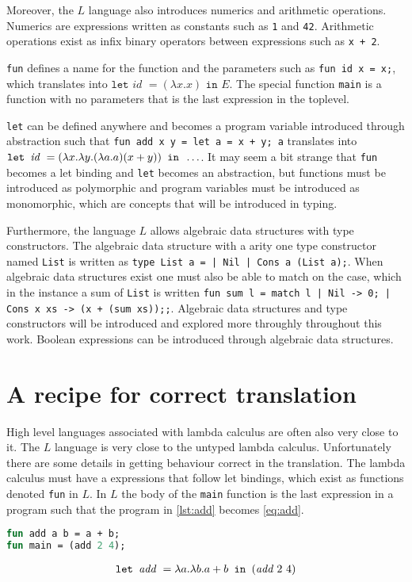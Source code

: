Moreover, the $L$ language also introduces numerics and arithmetic operations.
Numerics are expressions written as constants such as \texttt{1} and \texttt{42}.
Arithmetic operations exist as infix binary operators between expressions such as \texttt{x + 2}.

\texttt{fun} defines a name for the function and the parameters such as \texttt{fun id x = x;}, which translates into $\texttt{let } \textit{id } = (\lambda x.x) \texttt{ in } E$.
The special function \texttt{main} is a function with no parameters that is the last expression in the toplevel.

\texttt{let} can be defined anywhere and becomes a program variable introduced through abstraction such that \texttt{fun add x y = let a = x + y; a} translates into $\letexp{id}{(\lambda x. \lambda y. (\lambda a.a) (x + y))}{\dots}$.
It may seem a bit strange that \texttt{fun} becomes a let binding and \texttt{let} becomes an abstraction, but functions must be introduced as polymorphic and program variables must be introduced as monomorphic, which are concepts that will be introduced in typing.

Furthermore, the language $L$ allows algebraic data structures with type constructors.
The algebraic data structure with a arity one type constructor named \texttt{List} is written as \texttt{type List a = | Nil | Cons a (List a);}.
When algebraic data structures exist one must also be able to match on the case, which in the instance a sum of \texttt{List} is written \texttt{fun sum l = match l | Nil -> 0; | Cons x xs -> (x + (sum xs));;}.
Algebraic data structures and type constructors will be introduced and explored more throughly throughout this work.
Boolean expressions can be introduced through algebraic data structures.

\section{A recipe for correct translation}
High level languages associated with lambda calculus are often also very close to it.
The $L$ language is very close to the untyped lambda calculus.
Unfortunately there are some details in getting behaviour correct in the translation.
The lambda calculus must have a expressions that follow let bindings, which exist as functions denoted \texttt{fun} in $L$.
In $L$ the body of the \texttt{main} function is the last expression in a program such that the program in \autoref{lst:add} becomes \autoref{eq:add}.
\begin{lstlisting}[language=ML,caption={Add function in L},label={lst:add}]
fun add a b = a + b;
fun main = (add 2 4);
\end{lstlisting}
\begin{align}
  \texttt{let } \textit{add } = \lambda a.\lambda b.a + b \texttt{ in } (\textit{add } 2 \,\, 4)\label{eq:add}
\end{align}

